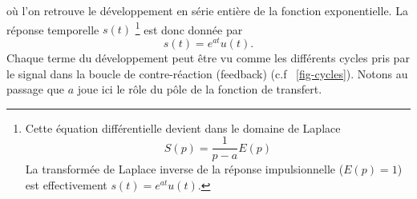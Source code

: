 où l'on retrouve le développement en série entière de la fonction 
exponentielle. La réponse temporelle $s(t)$
\footnote{
Cette équation différentielle devient dans le domaine de Laplace
\[
    S(p)=\dfrac{1}{p-a}E(p)
\]
La transformée de Laplace inverse de la réponse impulsionnelle ($E(p)=1$)
est effectivement $s(t)=e^{at}u(t)$.
}
est donc donnée par 
\[
    s(t)=e^{at}u(t).
\]
Chaque terme du développement peut être vu comme les différents cycles 
pris par le signal dans la boucle de contre-réaction (feedback) 
(c.f ~\cref{fig-cycles}).
Notons au passage que $a$ joue ici le rôle du pôle de la fonction de transfert. 
